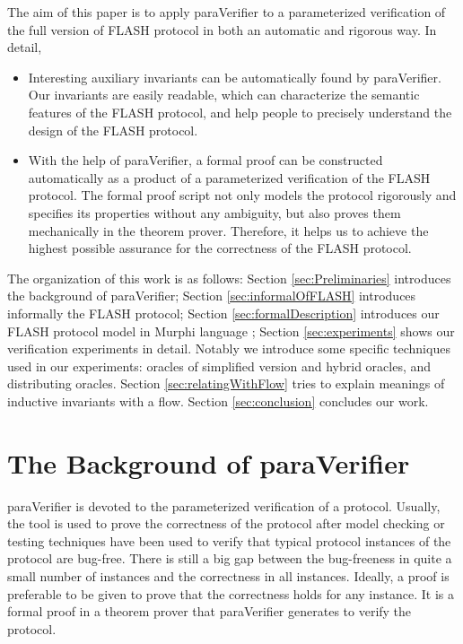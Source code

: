 \documentclass{llncs-new}
\newcommand{\bedt}[1]{{\color{black}#1}}
\begin{document}
The aim of this paper is to apply {\sf paraVerifier} \cite{liatva2015} to a  parameterized verification of the full version of FLASH protocol in both an automatic and rigorous way. In detail,
\vspace{-5pt}
\begin{itemize}
\item Interesting auxiliary invariants can be  automatically found by {\sf paraVerifier}. Our invariants are \bedt{easily readable}, which can characterize the semantic features of the FLASH protocol, and help people to precisely understand the design of the  FLASH protocol.

\item With the help of {\sf paraVerifier}, a formal proof can be constructed automatically as a product of a parameterized verification of the FLASH protocol. The formal proof script not  only models the protocol rigorously and specifies its properties without any ambiguity, but also proves them mechanically in the theorem prover. Therefore, it helps us to achieve the highest possible assurance for the correctness of the FLASH protocol.


\end{itemize}
\vspace{-5pt}
The organization of this work is as follows: Section \ref{sec:Preliminaries} introduces the background of {\sf paraVerifier}; Section  \ref{sec:informalOfFLASH} introduces informally the FLASH protocol; Section \ref{sec:formalDescription} introduces our FLASH protocol model in Murphi \bedt{language} \cite{Dill1996}; Section \ref{sec:experiments} shows our verification experiments in detail. Notably we introduce some \bedt{specific techniques} used in our experiments: oracles of simplified version and hybrid oracles, and distributing oracles. Section \ref{sec:relatingWithFlow} tries to explain meanings of inductive invariants with a flow.  Section \ref{sec:conclusion} concludes our work.
\vspace{-10pt}
\section{The Background  of {\sf paraVerifier}\label{sec:Preliminaries}}
\vspace{-5pt}
{\sf paraVerifier} is devoted to the parameterized verification of a protocol. Usually, the tool is used to prove the correctness of the protocol after model checking or testing techniques have been used to verify that typical protocol instances of the protocol  are bug-free. There is still a big gap between the bug-freeness in quite a small number of instances and the correctness in all instances.  Ideally, a proof is preferable to be given to  prove that the correctness holds for any instance. It is a formal proof in a theorem prover that {\sf paraVerifier} generates to verify the protocol. %
\end{document}
